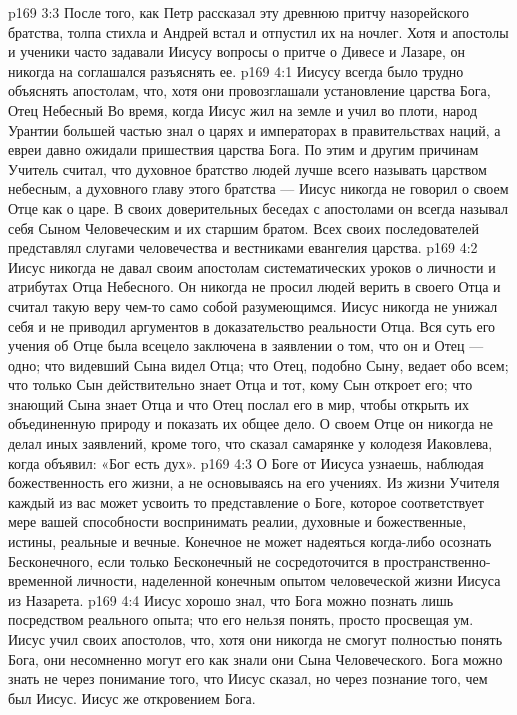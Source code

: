 \vs p169 3:3 После того, как Петр рассказал эту древнюю притчу назорейского братства, толпа стихла и Андрей встал и отпустил их на ночлег. Хотя и апостолы и ученики часто задавали Иисусу вопросы о притче о Дивесе и Лазаре, он никогда на соглашался разъяснять ее.
\vs p169 4:1 Иисусу всегда было трудно объяснять апостолам, что, хотя они провозглашали установление царства Бога, Отец Небесный  Во время, когда Иисус жил на земле и учил во плоти, народ Урантии большей частью знал о царях и императорах в правительствах наций, а евреи давно ожидали пришествия царства Бога. По этим и другим причинам Учитель считал, что духовное братство людей лучше всего называть царством небесным, а духовного главу этого братства ---  Иисус никогда не говорил о своем Отце как о царе. В своих доверительных беседах с апостолами он всегда называл себя Сыном Человеческим и их старшим братом. Всех своих последователей представлял слугами человечества и вестниками евангелия царства.
\vs p169 4:2 Иисус никогда не давал своим апостолам систематических уроков о личности и атрибутах Отца Небесного. Он никогда не просил людей верить в своего Отца и считал такую веру чем\hyp{}то само собой разумеющимся. Иисус никогда не унижал себя и не приводил аргументов в доказательство реальности Отца. Вся суть его учения об Отце была всецело заключена в заявлении о том, что он и Отец --- одно; что видевший Сына видел Отца; что Отец, подобно Сыну, ведает обо всем; что только Сын действительно знает Отца и тот, кому Сын откроет его; что знающий Сына знает Отца и что Отец послал его в мир, чтобы открыть их объединенную природу и показать их общее дело. О своем Отце он никогда не делал иных заявлений, кроме того, что сказал самарянке у колодезя Иаковлева, когда объявил: «Бог есть дух».
\vs p169 4:3 \pc О Боге от Иисуса узнаешь, наблюдая божественность его жизни, а не основываясь на его учениях. Из жизни Учителя каждый из вас может усвоить то представление о Боге, которое соответствует мере вашей способности воспринимать реалии, духовные и божественные, истины, реальные и вечные. Конечное не может надеяться когда\hyp{}либо осознать Бесконечного, если только Бесконечный не сосредоточится в пространственно\hyp{}временной личности, наделенной конечным опытом человеческой жизни Иисуса из Назарета.
\vs p169 4:4 Иисус хорошо знал, что Бога можно познать лишь посредством реального опыта; что его нельзя понять, просто просвещая ум. Иисус учил своих апостолов, что, хотя они никогда не смогут полностью понять Бога, они несомненно могут его  как знали они Сына Человеческого. Бога можно знать не через понимание того, что Иисус сказал, но через познание того, чем был Иисус. Иисус же  откровением Бога.
